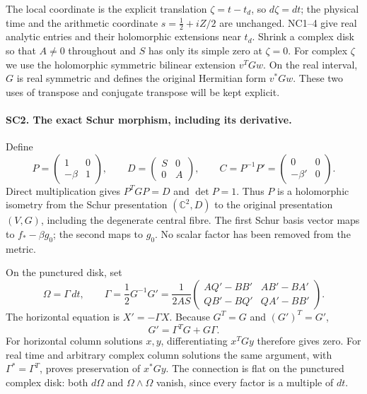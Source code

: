 The local coordinate is the explicit translation
\(\zeta=t-t_d\), so \(d\zeta=dt\); the physical time and the
arithmetic coordinate \(s=\frac12+iZ/2\) are unchanged.
NC1--4 give real analytic entries and their holomorphic extensions
near \(t_d\). Shrink a complex disk so that \(A\ne0\) throughout
and \(S\) has only its simple zero at \(\zeta=0\).
For complex \(\zeta\) we use the holomorphic symmetric bilinear
extension \(v^TGw\). On the real interval, \(G\) is real symmetric
and defines the original Hermitian form \(v^*Gw\). These two uses
of transpose and conjugate transpose will be kept explicit.

\paragraph{SC2. The exact Schur morphism, including its derivative.}
Define
\[
 P=\begin{pmatrix}1&0\\-\beta&1\end{pmatrix},\qquad
 D=\begin{pmatrix}S&0\\0&A\end{pmatrix},\qquad
 C=P^{-1}P'=\begin{pmatrix}0&0\\-\beta'&0\end{pmatrix}.
 \tag{SC6}
\]
Direct multiplication gives \(P^TGP=D\) and \(\det P=1\).
Thus \(P\) is a holomorphic isometry from the Schur presentation
\((\mathbb C^2,D)\) to the original presentation
\((V,G)\), including the degenerate central fibre. The first
Schur basis vector maps to \(f_*-\beta g_0\); the second maps to
\(g_0\). No scalar factor has been removed from the metric.

On the punctured disk, set
\[
 \Omega=\Gamma\,dt,\qquad
 \Gamma=\frac12G^{-1}G'
 =\frac1{2AS}
 \begin{pmatrix}
 A Q'-B B'&A B'-B A'\\
 Q B'-B Q'&Q A'-B B'
 \end{pmatrix}.
 \tag{SC7}
\]
The horizontal equation is \(X'=-\Gamma X\).
Because \(G^T=G\) and \((G')^T=G'\),
\[
 G'=\Gamma^TG+G\Gamma.
 \tag{SC8}
\]
For horizontal column solutions \(x,y\), differentiating
\(x^TGy\) therefore gives zero. For real time and arbitrary complex
column solutions the same argument, with \(\Gamma^*=\Gamma^T\),
proves preservation of \(x^*Gy\). The connection is flat on the
punctured complex disk: both \(d\Omega\) and
\(\Omega\wedge\Omega\) vanish, since every factor is a multiple
of \(dt\).

